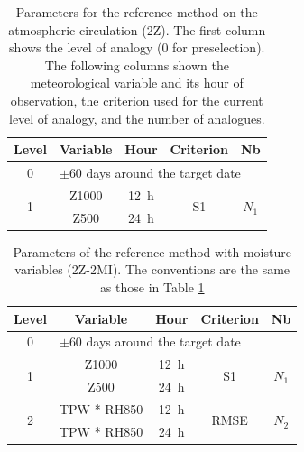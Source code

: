\documentclass[hess, manuscript]{copernicus}
\begin{document}
	
	\clearpage
	
	
	\begin{table}[htb]
		\caption{Parameters for the reference method on the atmospheric circulation (2Z). The first column shows the level of analogy (0 for preselection). The following columns shown the meteorological variable and its hour of observation, the criterion used for the current level of analogy, and the number of analogues.}
		\footnotesize
		\begin{center}
			\begin{tabular}{ccccc}
				\hline
				Level & Variable & Hour & Criterion & Nb \\ 
				\hline 
				0 & \multicolumn{4}{l}{$\pm 60$ days around the target date} \\
				\hline 
				\multirow{2}{*}{1} & Z1000 & 12~h & \multirow{2}{*}{S1} & \multirow{2}{*}{$N_{1}$} \\
				& Z500 & 24~h & & \\ 
				\hline 
			\end{tabular} 
		\end{center}
		\label{table:method_2Z}
	\end{table}
	
	\begin{table}[htb]
		\caption{Parameters of the reference method with moisture variables (2Z-2MI). The conventions are the same as those in Table \ref{table:method_2Z}}
		\footnotesize
		\begin{center}
			\begin{tabular}{ccccc}
				\hline 
				Level & Variable & Hour & Criterion & Nb \\ 
				\hline 
				0 & \multicolumn{4}{l}{$\pm 60$ days around the target date} \\
				\hline 
				\multirow{2}{*}{1} & Z1000 & 12~h & \multirow{2}{*}{S1} & \multirow{2}{*}{$N_{1}$} \\
				& Z500 & 24~h & & \\ 
				\hline
				\multirow{2}{*}{2} & TPW * RH850 & 12~h & \multirow{2}{*}{RMSE} & \multirow{2}{*}{$N_{2}$} \\
				& TPW * RH850 & 24~h & & \\ 
				\hline 
			\end{tabular} 
		\end{center}
		\label{table:method_2Z-2MI}
	\end{table}
	
	
	
	
\end{document}
